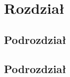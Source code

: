 
\chapter{Rozdział}

\lipsum[2]

\section{Podrozdział}

\lipsum[5]

\section{Podrozdział}

\lipsum[5]


